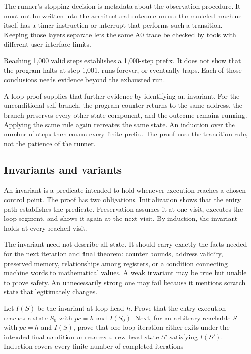 The runner's stopping decision is metadata about the observation procedure.
It must not be written into the architectural outcome unless the modeled
machine itself has a timer instruction or interrupt that performs such a
transition. Keeping those layers separate lets the same A0 trace be checked by
tools with different user-interface limits.

\begin{warning}[title={A bound is a resource limit, not a semantic verdict}]
Reaching 1,000 valid steps establishes a 1,000-step prefix. It does not show
that the program halts at step 1,001, runs forever, or eventually traps. Each
of those conclusions needs evidence beyond the exhausted run.
\end{warning}

A loop proof supplies that further evidence by identifying an invariant. For
the unconditional self-branch, the program counter returns to the same
address, the branch preserves every other state component, and the outcome
remains running. Applying the same rule again recreates the same state. An
induction over the number of steps then covers every finite prefix. The proof
uses the transition rule, not the patience of the runner.

\subsection{Invariants and variants}

An invariant is a predicate intended to hold whenever execution reaches a
chosen control point. The proof has two obligations. Initialization shows that
the entry path establishes the predicate. Preservation assumes it at one
visit, executes the loop segment, and shows it again at the next visit. By
induction, the invariant holds at every reached visit.

The invariant need not describe all state. It should carry exactly the facts
needed for the next iteration and final theorem: counter bounds, address
validity, preserved memory, relationships among registers, or a condition
connecting machine words to mathematical values. A weak invariant may be true
but unable to prove safety. An unnecessarily strong one may fail because it
mentions scratch state that legitimately changes.

\begin{proofkit}[title={Loop-invariant induction}]
Let \(I(S)\) be the invariant at loop head \(h\). Prove that the entry
execution reaches a state \(S_0\) with \(pc=h\) and \(I(S_0)\). Next,
for an arbitrary reachable \(S\) with \(pc=h\) and \(I(S)\), prove that
one loop iteration either exits under the intended final condition or reaches a
new head state \(S'\) satisfying \(I(S')\). Induction covers every finite
number of completed iterations.
\end{proofkit}

